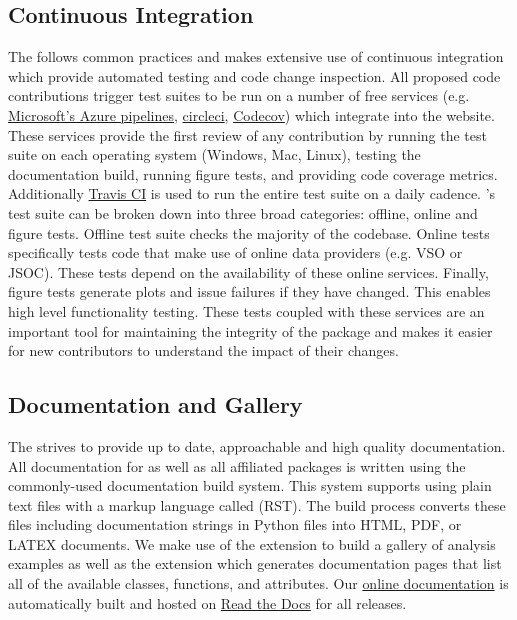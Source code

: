 \subsection{Continuous Integration}
The \sunpyproj follows common practices and makes extensive use of continuous integration which provide automated testing and code change inspection.
All proposed code contributions trigger test suites to be run on a number of free services (e.g. 
\href{https://azure.microsoft.com/en-gb/services/devops/pipelines/}{Microsoft's Azure pipelines},
\href{https://circleci.com}{circleci},
\href{https://codecov.io/}{Codecov}) which integrate into the \github website. 
These services provide the first review of any contribution by running the test suite on each operating system (Windows, Mac, Linux), testing the documentation build, running figure tests, and providing code coverage metrics.
Additionally \href{https://travis-ci.org}{Travis CI} is used to run the entire test suite on a daily cadence.
\sunpypkg's test suite can be broken down into three broad categories: offline, online and figure tests.
Offline test suite checks the majority of the codebase.
Online tests specifically tests code that make use of online data providers (e.g. VSO or JSOC).
These tests depend on the availability of these online services.
Finally, figure tests generate plots and issue failures if they have changed.
This enables high level functionality testing.
These tests coupled with these services are an important tool for maintaining the integrity of the package and makes it easier for new contributors to understand the impact of their changes.

\subsection{Documentation and Gallery}
The \sunpyproj strives to provide up to date, approachable and high quality documentation.
All documentation for \sunpypkg as well as all affiliated packages is written using the commonly-used  documentation build system.
This system supports using plain text files with a markup language called  (RST).
The build process converts these files including documentation strings in Python files into HTML, PDF, or LATEX documents.
We make use of the  extension to build a gallery of analysis examples as well as the extension  which generates documentation pages that list all of the available classes, functions, and attributes.
Our \href{http://docs.sunpy.org/en/stable/}{online documentation} is automatically built and hosted on \href{https://readthedocs.org/}{Read the Docs} for all releases.